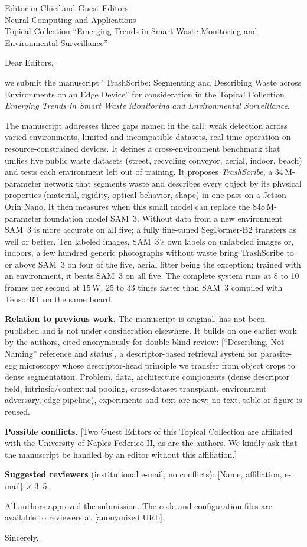 \documentclass[11pt]{letter}
\begin{document}
\begin{letter}{Editor-in-Chief and Guest Editors\\Neural Computing and Applications\\Topical Collection ``Emerging Trends in Smart Waste Monitoring and Environmental Surveillance''}
\opening{Dear Editors,}

we submit the manuscript ``TrashScribe: Segmenting and Describing Waste across Environments on an Edge Device'' for consideration in the Topical Collection \emph{Emerging Trends in Smart Waste Monitoring and Environmental Surveillance}.

The manuscript addresses three gaps named in the call: weak detection across varied environments, limited and incompatible datasets, real-time operation on resource-constrained devices. It defines a cross-environment benchmark that unifies five public waste datasets (street, recycling conveyor, aerial, indoor, beach) and tests each environment left out of training. It proposes \emph{TrashScribe}, a 34\,M-parameter network that segments waste and describes every object by its physical properties (material, rigidity, optical behavior, shape) in one pass on a Jetson Orin Nano. It then measures when this small model can replace the 848\,M-parameter foundation model SAM~3. Without data from a new environment SAM~3 is more accurate on all five; a fully fine-tuned SegFormer-B2 transfers as well or better. Ten labeled images, SAM~3's own labels on unlabeled images or, indoors, a few hundred generic photographs without waste bring TrashScribe to or above SAM~3 on four of the five, aerial litter being the exception; trained with an environment, it beats SAM~3 on all five. The complete system runs at 8 to 10 frames per second at 15\,W, 25 to 33 times faster than SAM~3 compiled with TensorRT on the same board.

\textbf{Relation to previous work.} The manuscript is original, has not been published and is not under consideration elsewhere. It builds on one earlier work by the authors, cited anonymously for double-blind review: [``Describing, Not Naming'' reference and status], a descriptor-based retrieval system for parasite-egg microscopy whose descriptor-head principle we transfer from object crops to dense segmentation. Problem, data, architecture components (dense descriptor field, intrinsic/contextual pooling, cross-dataset transplant, environment adversary, edge pipeline), experiments and text are new; no text, table or figure is reused.

\textbf{Possible conflicts.} [Two Guest Editors of this Topical Collection are affiliated with the University of Naples Federico II, as are the authors. We kindly ask that the manuscript be handled by an editor without this affiliation.]

\textbf{Suggested reviewers} (institutional e-mail, no conflicts): [Name, affiliation, e-mail] $\times$ 3--5.

All authors approved the submission. The code and configuration files are available to reviewers at [anonymized URL].

\closing{Sincerely,}
\end{letter}
\end{document}
